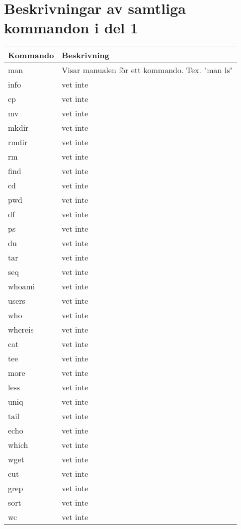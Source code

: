 \documentclass[11pt]{article}
\begin{document}
\section{Beskrivningar av samtliga kommandon i del 1}
\begin{center}
    \begin{tabular}{ | l | p{10cm} |}
    \hline
    Kommando & Beskrivning \\ \hline
    man & Visar manualen för ett kommando. Tex. "man ls" \\ \hline
    info & vet inte \\ \hline	
	cp & vet inte \\ \hline	
	mv & vet inte \\ \hline	
	mkdir & vet inte \\ \hline	
	rmdir & vet inte \\ \hline	
	rm & vet inte \\ \hline	
	find & vet inte \\ \hline	
	cd & vet inte \\ \hline	
	pwd & vet inte \\ \hline	
	df & vet inte \\ \hline	
	ps & vet inte \\ \hline	
	du & vet inte \\ \hline	
	tar & vet inte \\ \hline	
	seq & vet inte \\ \hline	
	whoami & vet inte \\ \hline	
	users & vet inte \\ \hline	
	who & vet inte \\ \hline	
	whereis & vet inte \\ \hline	
	cat & vet inte \\ \hline	
	tee & vet inte \\ \hline	
	more & vet inte \\ \hline	
	less & vet inte \\ \hline	
	uniq & vet inte \\ \hline	
	tail & vet inte \\ \hline	
	echo & vet inte \\ \hline	
	which & vet inte \\ \hline	
	wget & vet inte \\ \hline	
	cut & vet inte \\ \hline	
	grep & vet inte \\ \hline	
	sort & vet inte \\ \hline	
	wc & vet inte \\ \hline	    
    \end{tabular}
\end{center}
\end{document}
